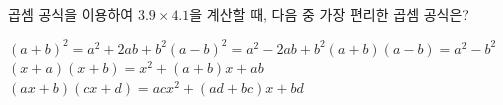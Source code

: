곱셈 공식을 이용하여 $3.9\times4.1$을 계산할 때, 다음 중 가장 편리한 곱셈 공식은?
\begin{choicesv}{$(a+b)^2=a^2+2ab+b^2$}{$(a-b)^2=a^2-2ab+b^2$}{$(a+b)(a-b)=a^2-b^2$}{$(x+a)(x+b)=x^2+(a+b)x+ab$}{$(ax+b)(cx+d)=acx^2+(ad+bc)x+bd$}\end{choicesv}
